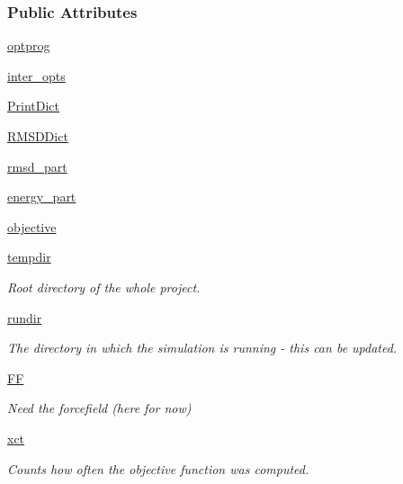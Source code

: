 \subsubsection*{\-Public \-Attributes}
\begin{DoxyCompactItemize}
\item 
\hyperlink{classforcebalance_1_1tinkerio_1_1BindingEnergy__TINKER_a44fd0c1d2f47a025f74f2cab0d076312}{optprog}
\item 
\hyperlink{classforcebalance_1_1binding_1_1BindingEnergy_a930899b4602a6a10a803cf46464ed532}{inter\-\_\-opts}
\item 
\hyperlink{classforcebalance_1_1binding_1_1BindingEnergy_afa4bc73efa73b10aa56f60548de96751}{\-Print\-Dict}
\item 
\hyperlink{classforcebalance_1_1binding_1_1BindingEnergy_aed49db6bc9305a0ca359f2a5035438b3}{\-R\-M\-S\-D\-Dict}
\item 
\hyperlink{classforcebalance_1_1binding_1_1BindingEnergy_a4af9005899de2d060261e535a2e6b465}{rmsd\-\_\-part}
\item 
\hyperlink{classforcebalance_1_1binding_1_1BindingEnergy_a0bac2f1084de788b25d23820fea6465b}{energy\-\_\-part}
\item 
\hyperlink{classforcebalance_1_1binding_1_1BindingEnergy_a7d1774098b8fbf465484334477db59ab}{objective}
\item 
\hyperlink{classforcebalance_1_1target_1_1Target_aede2856573b890cd47054ad36937d6f6}{tempdir}
\begin{DoxyCompactList}\small\item\em \-Root directory of the whole project. \end{DoxyCompactList}\item 
\hyperlink{classforcebalance_1_1target_1_1Target_a1da470037ef61c22dc44beb85cfa01a9}{rundir}
\begin{DoxyCompactList}\small\item\em \-The directory in which the simulation is running -\/ this can be updated. \end{DoxyCompactList}\item 
\hyperlink{classforcebalance_1_1target_1_1Target_a796dc30a19a60c63fb43b088d40a963f}{\-F\-F}
\begin{DoxyCompactList}\small\item\em \-Need the forcefield (here for now) \end{DoxyCompactList}\item 
\hyperlink{classforcebalance_1_1target_1_1Target_ad4cd0ab38d8fc97d3e7a6e22ce130a16}{xct}
\begin{DoxyCompactList}\small\item\em \-Counts how often the objective function was computed. \end{DoxyCompactList}\item 

\end{DoxyCompactItemize}
